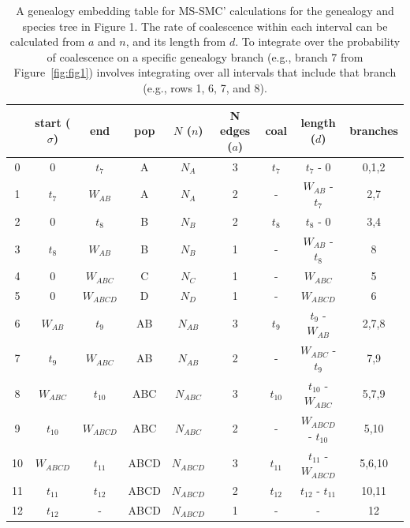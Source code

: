 \documentclass[11pt]{article}
\begin{document}
\begin{table}[h]
\centering
\caption{
	A genealogy embedding table for MS-SMC' calculations for the genealogy and
 	species tree in Figure 1. The rate of coalescence within each interval can 
 	be calculated from $a$ and $n$, and its length from $d$.
	To integrate over the probability of coalescence on a specific genealogy
	branch (e.g., branch 7 from Figure~\ref{fig:fig1}) involves 
	integrating over all intervals that include that branch (e.g., rows 
	1, 6, 7, and 8).
}
\begin{tabular}[t]{ |c|c|c|c|c|c|c|c|c| }
	\toprule
	 & start ($\sigma$)  & end  & pop & $N$ ($n$)  & N edges ($a$) & coal  & length ($d$) & branches \\
	\midrule
	0 & 0          & $t_7$      & A   & $N_A$     & 3 & $t_7$    & $t_7$ - 0            & 0,1,2 \\
	1 & $t_7$      & $W_{AB}$   & A   & $N_A$     & 2 & -        & $W_{AB}$ - $t_7$     & 2,7   \\	
	2 & 0          & $t_8$      & B   & $N_B$     & 2 & $t_8$    & $t_8$ - 0            & 3,4   \\ 
	3 & $t_8$      & $W_{AB}$   & B   & $N_B$     & 1 & -        & $W_{AB}$ - $t_8$     & 8     \\
	4 & 0          & $W_{ABC}$  & C   & $N_C$     & 1 & -        & $W_{ABC}$            & 5     \\
	5 & 0          & $W_{ABCD}$ & D   & $N_D$     & 1 & -        & $W_{ABCD}$           & 6     \\
	6 & $W_{AB}$   & $t_9$      & AB  & $N_{AB}$  & 3 & $t_9$    & $t_9$ - $W_{AB}$     & 2,7,8 \\
	7 & $t_9$      & $W_{ABC}$  & AB  & $N_{AB}$  & 2 & -        & $W_{ABC}$ - $t_9$    & 7,9   \\
	8 & $W_{ABC}$  & $t_{10}$   & ABC & $N_{ABC}$ & 3 & $t_{10}$ & $t_{10}$ - $W_{ABC}$ & 5,7,9  \\
	9 & $t_{10}$   & $W_{ABCD}$ & ABC & $N_{ABC}$ & 2 & -        & $W_{ABCD}$ - $t_{10}$ & 5,10 \\
	10 & $W_{ABCD}$ & $t_{11}$  & ABCD & $N_{ABCD}$ & 3 & $t_{11}$ & $t_{11}$ - $W_{ABCD}$ & 5,6,10 \\
	11 & $t_{11}$  & $t_{12}$   & ABCD & $N_{ABCD}$ & 2 & $t_{12}$ & $t_{12}$ - $t_{11}$ & 10,11 \\
	12 & $t_{12}$  & -          & ABCD & $N_{ABCD}$ & 1 & -        & -                   & 12    \\	
	\bottomrule
\end{tabular}
\label{tab:table-1} 
\end{table}
\end{document}

